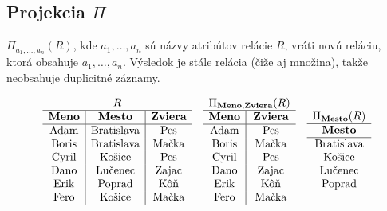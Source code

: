 \subsection*{\textbf{Projekcia $\Pi$}} $\Pi_{a_1, \dots, a_n}(R)$, kde $a_1, \dots, a_n$ sú názvy
atribútov relácie $R$, vráti novú reláciu, ktorá obsahuje  $a_1, \dots, a_n$.
Výsledok je stále relácia (čiže aj množina), takže neobsahuje duplicitné záznamy.
    \begin{priklad}
    \begin{center}
        \[
        \begin{array}{c c c}
            \begin{array}{c|c|c}
            \multicolumn{3}{c}{R} \\ \hline
            \textbf{Meno} & \textbf{Mesto}    & \textbf{Zviera} \\ \hline
            \text{Adam}   & \text{Bratislava} & \text{Pes} \\
            \text{Boris}  & \text{Bratislava} & \text{Mačka} \\
            \text{Cyril}  & \text{Košice}     & \text{Pes} \\
            \text{Dano}   & \text{Lučenec}    & \text{Zajac} \\
            \text{Erik}   & \text{Poprad}     & \text{Kôň} \\
            \text{Fero}   & \text{Košice}     & \text{Mačka} \\
            \end{array}
            &
            \begin{array}{c|c}
            \multicolumn{2}{c}{\Pi_{\textbf{Meno}, \textbf{Zviera}}(R)} \\ \hline
            \textbf{Meno} & \textbf{Zviera} \\ \hline
            \text{Adam}   & \text{Pes} \\
            \text{Boris}  & \text{Mačka} \\
            \text{Cyril}  & \text{Pes} \\
            \text{Dano}   & \text{Zajac} \\
            \text{Erik}   & \text{Kôň} \\
            \text{Fero}   & \text{Mačka} \\
            \end{array}
            &
            \begin{array}{c}
            \multicolumn{1}{c}{\Pi_{\textbf{Mesto}}(R)} \\ \hline
            \textbf{Mesto}   \\ \hline
            \text{Bratislava}\\
            \text{Košice}    \\
            \text{Lučenec}   \\
            \text{Poprad}    \\
            \end{array}
        \end{array}
        \]
    \end{center}
    \end{priklad}
    
